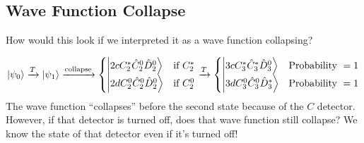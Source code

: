 \documentclass[a4paper,twoside,master.tex]{subfiles}
\begin{document}
\subsection{Wave Function Collapse}%
\label{sub:wave_function_collapse}

How would this look if we interpreted it as a wave function collapsing?

\begin{equation}
    \ket{\psi_0}\xrightarrow{T}\ket{\psi_1}\xrightarrow{\text{collapse}}\begin{cases}
        \ket{2cC_2^*\hat{C}_2^0 \hat{D}_2^0} &\text{if }C_2^*\\
        \ket{2dC_2^0\hat{C}_2^0 \hat{D}_2^0} &\text{if }C_2^0
    \end{cases}\xrightarrow{T}\begin{cases}
    \ket{3cC_3^*\hat{C}_3^*\hat{D}_3^0} &\text{Probability } =1\\
    \ket{3dC_3^0\hat{C}_3^0\hat{D}_3^*} &\text{Probability } =1
    \end{cases}
\end{equation}
The wave function ``collapses'' before the second state because of the $C$ detector. However, if that detector is turned off, does that wave function still collapse? We know the state of that detector even if it's turned off!
\end{document}
